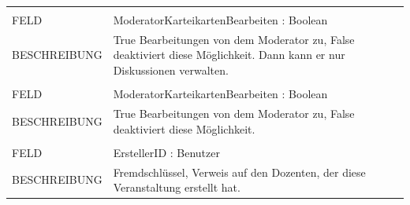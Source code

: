 \documentclass[12pt,a4paper]{article}
\begin{document}
\begin{tabular}{|lp{12cm}|}
	&  \\
	FELD		    &  ModeratorKarteikartenBearbeiten : Boolean\\ 
	BESCHREIBUNG	&  True Bearbeitungen von dem Moderator zu, False deaktiviert diese Möglichkeit. Dann kann er nur Diskussionen verwalten. \\
	&  \\
	FELD		    &  ModeratorKarteikartenBearbeiten : Boolean\\ 
	BESCHREIBUNG	&  True Bearbeitungen von dem Moderator zu, False deaktiviert diese Möglichkeit. \\
	&  \\
	FELD		    &  ErstellerID : Benutzer\\ 
	BESCHREIBUNG	&  Fremdschlüssel, Verweis auf den Dozenten, der diese Veranstaltung erstellt hat. \\
	\hline
\end{tabular}\\\\
\end{document}
